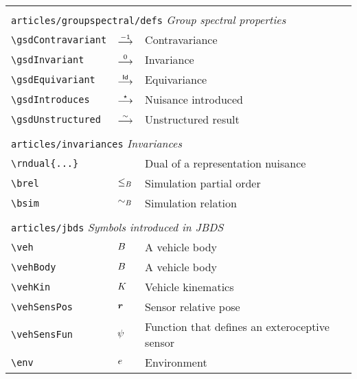 \begin{longtable}{lll}
  &  & \\ 
 \multicolumn{3}{l}{{\color[rgb]{0.5,0.5,0.5}\texttt{articles/groupspectral/defs}} \emph{Group spectral properties}}\\ 
 \hline
{\color[rgb]{0.5,0.5,0.5}\texttt{\textbackslash gsdContravariant}} & $\stackrel{-1}{\longrightarrow}$ &  Contravariance\\ 
 {\color[rgb]{0.5,0.5,0.5}\texttt{\textbackslash gsdInvariant}} & $\stackrel{0}{\longrightarrow}$ &  Invariance\\ 
 {\color[rgb]{0.5,0.5,0.5}\texttt{\textbackslash gsdEquivariant}} & $\stackrel{\mathsf{Id}}{\longrightarrow}$ &  Equivariance\\ 
 {\color[rgb]{0.5,0.5,0.5}\texttt{\textbackslash gsdIntroduces}} & $\stackrel{\star}{\longrightarrow}$ &  Nuisance introduced\\ 
 {\color[rgb]{0.5,0.5,0.5}\texttt{\textbackslash gsdUnstructured}} & $\stackrel{\sim}{\longrightarrow}$ &  Unstructured result\\ 
  &  & \\ 
 \multicolumn{3}{l}{{\color[rgb]{0.5,0.5,0.5}\texttt{articles/invariances}} \emph{Invariances}}\\ 
 \hline
{\color[rgb]{0.5,0.5,0.5}\texttt{\textbackslash rndual\{...\}}} &  &  Dual of a representation nuisance\\ 
 {\color[rgb]{0.5,0.5,0.5}\texttt{\textbackslash brel}} & $\leq_{B}$ &  Simulation partial order\\ 
 {\color[rgb]{0.5,0.5,0.5}\texttt{\textbackslash bsim}} & $\sim_{B}$ &  Simulation relation\\ 
  &  & \\ 
 \multicolumn{3}{l}{{\color[rgb]{0.5,0.5,0.5}\texttt{articles/jbds}} \emph{Symbols introduced in JBDS}}\\ 
 \hline
{\color[rgb]{0.5,0.5,0.5}\texttt{\textbackslash veh}} & $B$ &  A vehicle body\\ 
 {\color[rgb]{0.5,0.5,0.5}\texttt{\textbackslash vehBody}} & $B$ &  A vehicle body\\ 
 {\color[rgb]{0.5,0.5,0.5}\texttt{\textbackslash vehKin}} & $K$ &  Vehicle kinematics \\ 
 {\color[rgb]{0.5,0.5,0.5}\texttt{\textbackslash vehSensPos}} & $\boldsymbol{r}$ &  Sensor relative pose\\ 
 {\color[rgb]{0.5,0.5,0.5}\texttt{\textbackslash vehSensFun}} & $\psi$ &  Function that defines an exteroceptive sensor\\ 
 {\color[rgb]{0.5,0.5,0.5}\texttt{\textbackslash env}} & $e$ &  Environment\\ 

\end{longtable}
